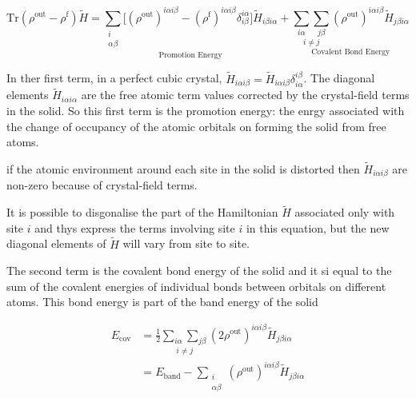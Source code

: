 \documentclass[11pt]{article}
\begin{document}
\begin{enumerate}
\begin{enumerate}
\begin{enumerate}
\begin{equation}
\text{Tr}(\rho^{\text{out}} - \rho^{\text{f}})\widetilde{H} =
   \underset{\text{Promotion Energy}}{ 
      \sum_{\substack{i \\ \alpha\beta}} 
         \big[ (\rho^{\text{out}})^{i\alpha i\beta} -
               (\rho^{\text{f}})^{i\alpha i\beta} \delta^{i\alpha}_{i\beta} \big]
         \widetilde{H}_{i\beta i\alpha} 
            }
  + \underset{\text{Covalent Bond Energy}}{
      \underset{i \neq j}{ \sum_{i \alpha}\sum_{j \beta} }
         (\rho^{\text{out}})^{i\alpha i\beta} \widetilde{H}_{j\beta i\alpha}
                }
\end{equation}

In ther first term, in a perfect cubic crystal, 
\(\widetilde{H}_{i\alpha i\beta} = \widetilde{H}_{i\alpha i\beta}
\delta^{i\beta}_{i\alpha}\).
The diagonal elements \(\widetilde{H}_{i\alpha i\alpha}\) are the free atomic
term values corrected by the crystal-field terms in the solid. So this first
term is the promotion energy: the enrgy associated with the change of
occupancy of the atomic orbitals on forming the solid from free atoms. 

if the atomic environment around each site in the solid is distorted then
\(\widetilde{H}_{i\alpha i\beta}\) are non-zero because of crystal-field terms.

It is possible to disgonalise the part of the Hamiltonian \(\widetilde{H}\)
associated only with site \(i\) and thys express the terms involving site \(i\) in
this equation, but the new diagonal elements of \(\widetilde{H}\) will vary from site
to site.

The second term is the covalent bond energy of the solid and it si equal to
the sum of the covalent energies of individual bonds between orbitals on
different atoms. This bond energy is part of the band energy of the solid

\begin{LaTeX}
\begin{align}
E_{\text{cov}} &= \frac{1}{2}  \underset{i \neq j}{ \sum_{i \alpha}\sum_{j \beta} }
         (2 \rho^{\text{out}})^{i\alpha i\beta} \widetilde{H}_{j\beta i\alpha}\\
               &= E_{\text{band}} - 
              \sum_{\substack{ i\\ \alpha\beta}} 
                   (\rho^{\text{out}})^{i\alpha i\beta}
                    \widetilde{H}_{j\beta i\alpha}
\end{align}
\end{LaTeX}



\end{enumerate}
\end{enumerate}
\end{enumerate}
\end{document}
